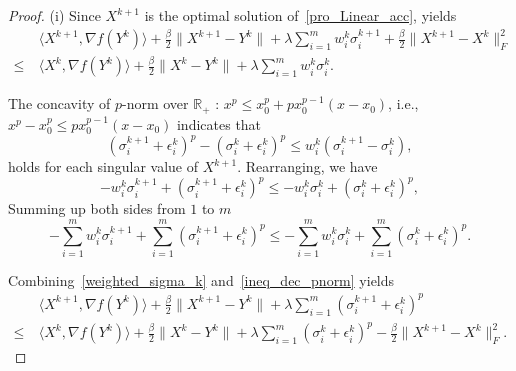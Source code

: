 \documentclass[twoside,11pt]{article}
\numberwithin{equation}{section}
\begin{document}
\begin{proof}

(i) %
  Since $X^{k+1}$ is the optimal solution of~\eqref{pro_Linear_acc}, yields 
  \begin{equation} \label{weighted_sigma_k}
    \begin{aligned}
      &\ \langle X^{k+1},\nabla{f (Y^{k})}\rangle+\frac{\beta}{2}\|X^{k+1}-Y^{k}\|+\lambda\sum\limits_{i=1}^{m}w_{i}^{k}\sigma_i^{k+1}  + \frac{\beta}{2}\|X^{k+1}-X^{k}\|_{F}^{2} \\
    \le&\ \langle X^{k},\nabla{f (Y^{k})}\rangle+\frac{\beta}{2}\|X^{k}-Y^{k}\|+\lambda\sum\limits_{i=1}^{m}w_{i}^{k}\sigma_i^k.
    \end{aligned}
  \end{equation}

  The concavity of $p$-norm over $\mathbb{R}_{+} $ : $x^{p}\le x_{0}^{p}+px_{0}^{p-1} (x-x_{0})$, {i.e.}, 
  $
  x^{p} - x_{0}^{p} \le px_{0}^{p-1} (x - x_{0})
  $
  indicates that 
  \begin{equation*}
    \left(\sigma_i^{k+1} +\epsilon_{i}^{k}\right)^{p} -  \left(\sigma_i^k+\epsilon_{i}^{k}\right)^{p} 
    \le 
    w_{i}^{k} \left(\sigma_i^{k+1} -\sigma_i^k\right),
  \end{equation*}
  holds for each singular value of $X^{k+1}$. 
  Rearranging, we have 
  $$
  -w_{i}^{k} {\sigma}^{k+1}_i + \left(\sigma_i^{k+1} +\epsilon_{i}^{k}\right)^{p} 
  \le - w_{i}^{k}\sigma_i^k + \left(\sigma_i^k+\epsilon_{i}^{k}\right)^{p}, 
  $$ 
  Summing up both sides from  $1$ to $m$ 
  \begin{equation}\label{ineq_dec_pnorm}
    -\sum_{i=1}^{m} w_{i}^{k}\sigma_i^{k+1}   +  \sum_{i=1}^{m} \left(\sigma_i^{k+1} +\epsilon_{i}^{k} \right)^{p}
    \le
    -\sum_{i=1}^{m}w_{i}^{k} \sigma_i^k + \sum_{i=1}^{m} \left(\sigma_i^k+\epsilon_{i}^{k} \right)^{p}.
  \end{equation}
  
  Combining~\eqref{weighted_sigma_k} and~\eqref{ineq_dec_pnorm} yields 
  \begin{equation}\label{acc_ineq_Linearstrong}
    \begin{aligned}
    &\ \langle X^{k+1},\nabla{f (Y^{k})}\rangle+\frac{\beta}{2}\|X^{k+1}-Y^{k}\|+\lambda\sum\limits_{i=1}^{m} (\sigma_i^{k+1} +\epsilon_{i}^{k})^{p}  \\
      \le&\ \langle X^{k},\nabla{f (Y^{k})}\rangle+\frac{\beta}{2}\|X^{k}-Y^{k}\|+\lambda\sum\limits_{i=1}^{m} (\sigma_i^k+\epsilon_{i}^{k})^{p}-\frac{\beta}{2}\|X^{k+1}-X^{k}\|_{F}^{2}. 
    \end{aligned} 
  \end{equation} 


\end{proof}
\end{document}
